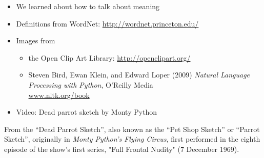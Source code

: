 \documentclass[a4paper,landscape,headrule,footrule,xetex]{foils}
\begin{document}

\begin{itemize}
\item We learned about how to talk about meaning
\end{itemize}


\begin{itemize}
\item Definitions from WordNet: \url{http://wordnet.princeton.edu/}
\item Images from
  \begin{itemize}
  \item the Open Clip Art Library: \url{http://openclipart.org/}
  \item Steven Bird, Ewan Klein, and Edward Loper (2009) 
     \textit{Natural Language Processing with Python}, O'Reilly Media
    \\ \url{www.nltk.org/book}
\end{itemize}
\item Video: Dead parrot sketch by Monty Python
\end{itemize}




\begin{quote} \large
\end{quote}

From the ``Dead Parrot Sketch'', also known as the ``Pet Shop Sketch''
or ``Parrot Sketch'', originally in \textit{Monty Python's Flying Circus},
first performed in the eighth episode of the show's first series,
"Full Frontal Nudity" (7 December 1969).









  
\small


\end{document}

